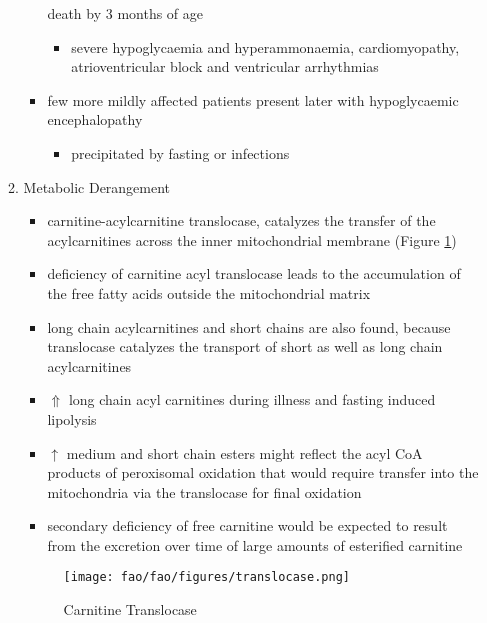 \documentclass{scrartcl}
\begin{document}
\begin{enumerate}
\begin{enumerate}
\begin{itemize}
death by 3 months of age
\begin{itemize}
\item severe hypoglycaemia and hyperammonaemia, cardiomyopathy,
atrioventricular block and ventricular arrhythmias
\end{itemize}
\item few more mildly affected patients present later with hypoglycaemic
encephalopathy
\begin{itemize}
\item precipitated by fasting or infections
\end{itemize}
\end{itemize}
\item Metabolic Derangement
\label{sec:org02f441c}
\begin{itemize}
\item carnitine-acylcarnitine translocase, catalyzes the transfer of the
acylcarnitines across the inner mitochondrial membrane (Figure \ref{fig:orge3b43f9})
\item deficiency of carnitine acyl translocase leads to the accumulation
of the free fatty acids outside the mitochondrial matrix
\item long chain acylcarnitines and short chains are also found, because
translocase catalyzes the transport of short as well as long chain
acylcarnitines
\item \(\Uparrow\) long chain acyl carnitines during illness and fasting
induced lipolysis
\item \(\uparrow\) medium and short chain esters might reflect the acyl CoA products
of peroxisomal oxidation that would require transfer into the
mitochondria via the translocase for final oxidation
\item secondary deficiency of free carnitine would be expected to result
from the excretion over time of large amounts of esterified
carnitine
\end{itemize}

\begin{figure}[htbp]
\centering
\texttt{[image: fao/fao/figures/translocase.png]}
\caption{\label{fig:orge3b43f9}Carnitine Translocase}
\end{figure}


\end{enumerate}
\end{enumerate}
\end{document}
